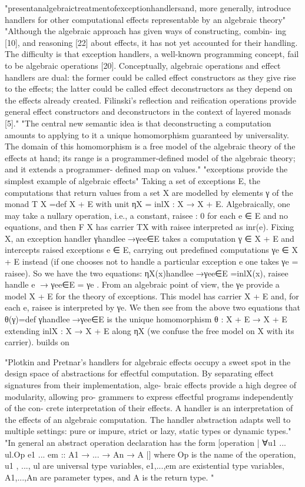 "presentanalgebraictreatmentofexceptionhandlersand, more generally, introduce handlers for other computational effects representable by an algebraic theory"
"Although the algebraic approach has given ways of constructing, combin- ing [10], and reasoning [22] about effects, it has not yet accounted for their handling. The difficulty is that exception handlers, a well-known programming concept, fail to be algebraic operations [20]. Conceptually, algebraic operations and effect handlers are dual: the former could be called effect constructors as they give rise to the effects; the latter could be called effect deconstructors as they depend on the effects already created. Filinski’s reflection and reification operations provide general effect constructors and deconstructors in the context of layered monads [5]."
"The central new semantic idea is that deconstructing a computation amounts to applying to it a unique homomorphism guaranteed by universality. The domain of this homomorphism is a free model of the algebraic theory of the effects at hand; its range is a programmer-defined model of the algebraic theory; and it extends a programmer- defined map on values."
"exceptions provide the simplest example of algebraic effects"
Taking a set of exceptions E, the computations that return values from a set X are modelled by elements γ of the monad T X =def X + E with unit ηX = inlX : X → X + E. Algebraically, one may take a nullary operation, i.e., a constant, raisee : 0 for each e ∈ E and no equations, and then F X has carrier TX with raisee interpreted as inr(e).
Fixing X, an exception handler γhandle{e􏰀→γe}e∈E takes a computation γ ∈ X + E and intercepts raised exceptions e ∈ E, carrying out predefined computations γe ∈ X + E instead (if one chooses not to handle a particular exception e one takes γe = raisee). So we have the two equations:
ηX(x)handle{e􏰀→γe}e∈E =inlX(x),
raisee handle {e 􏰀→ γe}e∈E = γe .
From an algebraic point of view, the γe provide a model X + E for the theory of exceptions. This model has carrier X + E and, for each e, raisee is interpreted by γe. We then see from the above two equations that
θ(γ)=def γhandle{e􏰀→γe}e∈E
is the unique homomorphism θ : X + E → X + E extending inlX : X → X + E along ηX (we confuse the free model on X with its carrier).
\cite{Plotkin:2009dr}
builds on
\cite{benton2001exceptional}


"Plotkin and Pretnar’s handlers for algebraic effects occupy a sweet spot in the design space of abstractions for effectful computation. By separating effect signatures from their implementation, alge- braic effects provide a high degree of modularity, allowing pro- grammers to express effectful programs independently of the con- crete interpretation of their effects. A handler is an interpretation of the effects of an algebraic computation. The handler abstraction adapts well to multiple settings: pure or impure, strict or lazy, static types or dynamic types."
"In general an abstract operation declaration has the form
[operation | ∀u1 ... ul.Op e1 ... em :: A1 → ... → An → A |]
where Op is the name of the operation, u1 , ..., ul are universal type variables, e1,...,em are existential type variables, A1,...,An are parameter types, and A is the return type. "

